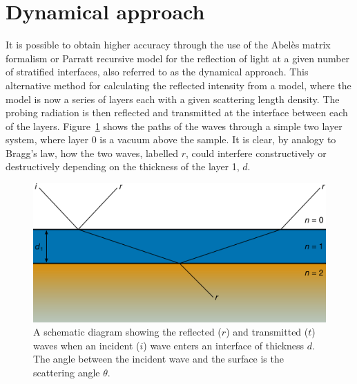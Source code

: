 \documentclass[
 reprint,
 superscriptaddress,
 amsmath,amssymb,
 aps,
]{revtex4-1}
\begin{document}
\section{Dynamical approach}
\label{sec:dyna}
It is possible to obtain higher accuracy through the use of the Abel\`{e}s matrix formalism \cite{abeles_sur_1948} or Parratt \cite{parratt_surface_1954} recursive model for the reflection of light at a given number of stratified interfaces, also referred to as the dynamical approach. 
This alternative method for calculating the reflected intensity from a model, where the model is now a series of layers each with a given scattering length density. 
The probing radiation is then reflected and transmitted at the interface between each of the layers.
Figure~\ref{fig:refr} shows the paths of the waves through a simple two layer system, where layer \num{0} is a vacuum above the sample. 
It is clear, by analogy to Bragg's law, how the two waves, labelled $r$, could interfere constructively or destructively depending on the thickness of the layer \num{1}, $d$. 
%
\begin{figure}[t]
    \includegraphics[width=\linewidth]{dynamic}
    \caption{A schematic diagram showing the reflected ($r$) and transmitted ($t$) waves when an incident ($i$) wave enters an interface of thickness $d$. The angle between the incident wave and the surface is the scattering angle $\theta$.}
    \label{fig:refr}
\end{figure}
%
\end{document}
